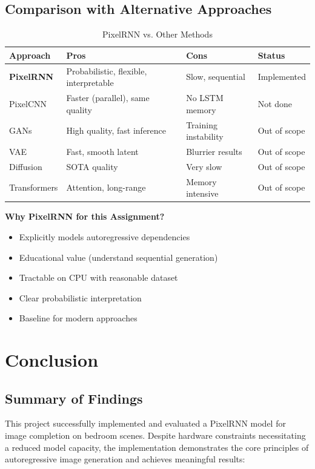 \documentclass[12pt,a4paper]{article}
\begin{document}
\subsection{Comparison with Alternative Approaches}

\begin{table}[H]
\centering
\caption{PixelRNN vs. Other Methods}
\small
\begin{tabular}{@{}lp{2cm}p{2.5cm}p{2cm}@{}}
\toprule
\textbf{Approach} & \textbf{Pros} & \textbf{Cons} & \textbf{Status} \\ \midrule
\textbf{PixelRNN} & Probabilistic, flexible, interpretable & Slow, sequential & Implemented \\
PixelCNN & Faster (parallel), same quality & No LSTM memory & Not done \\
GANs & High quality, fast inference & Training instability & Out of scope \\
VAE & Fast, smooth latent & Blurrier results & Out of scope \\
Diffusion & SOTA quality & Very slow & Out of scope \\
Transformers & Attention, long-range & Memory intensive & Out of scope \\ \bottomrule
\end{tabular}
\end{table}

\textbf{Why PixelRNN for this Assignment?}
\begin{itemize}
    \item Explicitly models autoregressive dependencies
    \item Educational value (understand sequential generation)
    \item Tractable on CPU with reasonable dataset
    \item Clear probabilistic interpretation
    \item Baseline for modern approaches
\end{itemize}

\section{Conclusion}

\subsection{Summary of Findings}

This project successfully implemented and evaluated a PixelRNN model for image completion on bedroom scenes. Despite hardware constraints necessitating a reduced model capacity, the implementation demonstrates the core principles of autoregressive image generation and achieves meaningful results:
\end{document}
